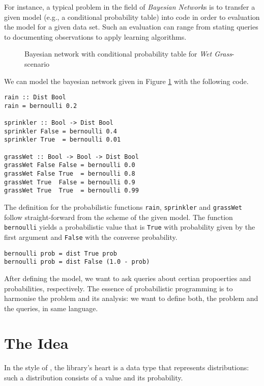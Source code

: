 \documentclass[
12pt, %
a4paper, %
oneside, %
]{llncs}
\newcommand{\code}[1]{{\texttt{#1}}}
\begin{document}
For instance, a typical problem in the field of \emph{Bayesian
  Network}s is to transfer a given model (e.g., a conditional
probability table) into code in order to evaluation the model for a
given data set. %
Such an evaluation can range from stating queries to documenting
observations to apply learning algorithms. %

\begin{figure}
\label{fig:WetGrass}
\caption{Bayesian network with conditional probability table for
  \emph{Wet Grass}-scenario}
\end{figure}

We can model the bayesian network given in Figure \ref{fig:WetGrass} with the following code. %

\begin{verbatim}
rain :: Dist Bool
rain = bernoulli 0.2

sprinkler :: Bool -> Dist Bool
sprinkler False = bernoulli 0.4
sprinkler True  = bernoulli 0.01

grassWet :: Bool -> Bool -> Dist Bool
grassWet False False = bernoulli 0.0
grassWet False True  = bernoulli 0.8
grassWet True  False = bernoulli 0.9
grassWet True  True  = bernoulli 0.99
\end{verbatim}

The definition for the probabilistic functions \code{rain},
\code{sprinkler} and \code{grassWet} follow straight-forward from the
scheme of the given model. %
The function \code{bernoulli} yields a probabilistic value that is
\code{True} with probability given by the first argument and
\code{False} with the converse probability. %

\begin{verbatim}
bernoulli prob = dist True prob
bernoulli prob = dist False (1.0 - prob)
\end{verbatim}

After defining the model, we want to ask queries about certian
propoerties and probabilities, respectively. %
The essence of probabilistic programming is to harmonise the problem
and its analysis: we want to define both, the problem and the queries,
in same language. %

\section{The Idea}

In the style of \cite{pfp}, the library's heart is a data type that
represents distributions: such a distribution consists of a value and
its probability. %
\end{document}
